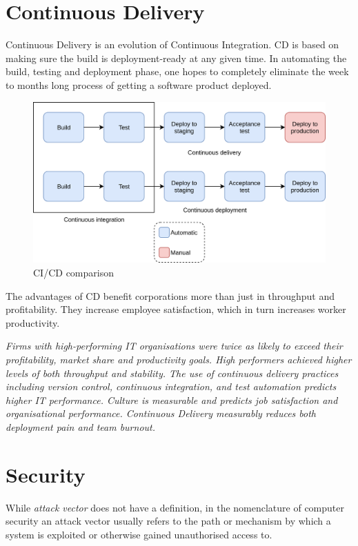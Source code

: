 \pagebreak[4]
\section{Continuous Delivery}
Continuous Delivery is an evolution of Continuous Integration. \acrshort{CD} is based on making sure the build is deployment-ready at any given time. In automating the build, testing and deployment phase, one hopes to completely eliminate the week to months long process of getting a software product deployed\cite{continuousdeliveryfaster}.   

\begin{figure}[h!]
  \includegraphics[width=\linewidth,height=\textheight,keepaspectratio]{images/ci_cd_comparison.png}
  \caption{CI/CD comparison}
  \label{fig:CI/CD-comparison}
\end{figure}

The advantages of \acrshort{CD} benefit corporations more than just in throughput and profitability. They increase employee satisfaction, which in turn increases worker productivity\cite{happy}.

\begin{displayquote}\textit{
    Firms with high-performing IT organisations were twice as likely to exceed their profitability, market share and productivity goals.
    High performers achieved higher levels of both throughput and stability.
    The use of continuous delivery practices including version control, continuous integration, and test automation predicts higher IT performance.
    Culture is measurable and predicts job satisfaction and organisational performance.
    Continuous Delivery measurably reduces both deployment pain and team burnout\cite{forsgren}.}
\end{displayquote}

\pagebreak[4]
\section{Security}
While \textit{attack vector} does not have a definition, in the nomenclature of computer security an attack vector usually refers to the path or mechanism by which a system is exploited or otherwise gained unauthorised access to\cite{av1}\cite{av2}\cite{av3}.

